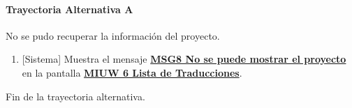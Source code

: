 \paragraph{Trayectoria Alternativa A} \label{W-PR-CU1.1:TA}
	No se pudo recuperar la información del proyecto.
	\begin{enumerate}[label=A\arabic*.]
		\item {[Sistema]} Muestra el mensaje \hyperref[MSG8]{\bf MSG8 No se puede mostrar el proyecto} en la pantalla \hyperref[fig:MIUW-6]{\bf MIUW 6 Lista de Traducciones}.
	\end{enumerate}
	Fin de la trayectoria alternativa.